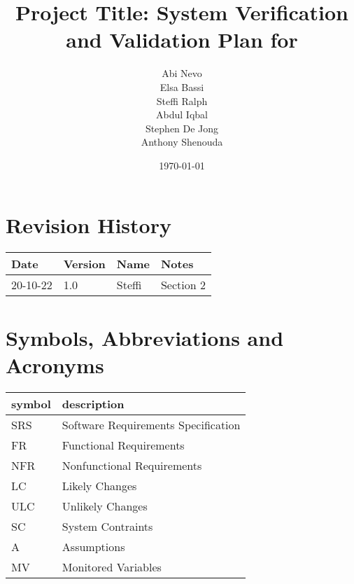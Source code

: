 \documentclass[12pt, titlepage]{article}
\begin{document}
\title{Project Title: System Verification and Validation Plan for } 
\author{Abi Nevo\\Elsa Bassi\\Steffi Ralph\\Abdul Iqbal\\Stephen De Jong\\Anthony Shenouda}
\date{\today}
	
\maketitle


\section{Revision History}

\begin{tabularx}{\textwidth}{p{2cm}p{2cm}p{2cm}X}
\toprule {\bf Date} & {\bf Version} & {\bf Name} & {\bf Notes}\\
\midrule
20-10-22 & 1.0 & Steffi & Section 2\\
\bottomrule
\end{tabularx}

\newpage

\tableofcontents

\listoftables
{}

\listoffigures
{}

\newpage

\section{Symbols, Abbreviations and Acronyms}



\renewcommand{\arraystretch}{1.2}
\begin{tabular}{l l} 
  \toprule		
  \textbf{symbol} & \textbf{description}\\
  \midrule 
  SRS & Software Requirements Specification\\
  FR & Functional Requirements\\
  NFR & Nonfunctional Requirements\\
  LC & Likely Changes\\
  ULC & Unlikely Changes\\
  SC & System Contraints\\
  A & Assumptions\\
  MV & Monitored Variables\\
  \bottomrule
\end{tabular}\\
\end{document}
